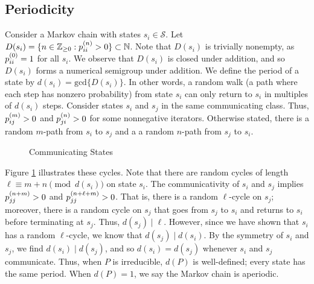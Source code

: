 \documentclass[../exploring-pagerank.tex]{subfiles}
\begin{document}
	\subsection{Periodicity}
	Consider a Markov chain with states $s_i \in \mathcal{S}$. Let $D(s_i) = \{n\in \mathbb{Z}_{\geq 0} : p^{(n)}_{ii} > 0 \} \subset \mathbb{N}$. Note that $D(s_i)$ is trivially nonempty, as $p^{(0)}_{ii} = 1$ for all $s_i$. We observe that $D(s_i)$ is closed under addition, and so $D(s_i)$ forms a numerical semigroup under addition. We define the period of a state by $d(s_i)=\text{gcd}\{D(s_i)\}$. In other words, a random walk (a path where each step has nonzero probability) from state $s_i$ can only return to $s_i$ in multiples of $d(s_i)$ steps. Consider states $s_i$ and $s_j$ in the same communicating class.
	Thus, $p^{(m)}_{ij} > 0$ and $p^{(n)}_{ji} > 0$ for some nonnegative iterators. Otherwise stated, there is a random $m$-path from $s_i$ to $s_j$ and a a random $n$-path from $s_j$ to $s_i$.
		\begin{figure}[h]
		\centering {}
		\caption{Communicating States}
		\label{fig:markov}
	\end{figure}

	Figure \ref{fig:markov} illustrates these cycles. Note that there are random cycles of length $\ell \equiv m+n \pmod{d(s_i)}$ on state $s_i$. The communicativity of $s_i$ and $s_j$ implies $p^{(n+m)}_{jj} > 0$ and $p^{(n + \ell + m)}_{jj} > 0$. That is, there is a random $\ell$-cycle on $s_j$; moreover, there is a random cycle on $s_j$ that goes from $s_j$ to $s_i$ and returns to $s_i$ before terminating at $s_j$. Thus, $d(s_j) \mid \ell$. However, since we have shown that $s_i$ has a random $\ell$-cycle, we know that $d(s_j) \mid d(s_i)$. By the symmetry of $s_i$ and $s_j$, we find $d(s_i) \mid d(s_j)$, and so $d(s_i) = d(s_j)$ whenever $s_i$ and $s_j$ communicate. Thus, when $P$ is irreducible, $d(P)$ is well-defined; every state has the same period. When $d(P) = 1$, we say the Markov chain is aperiodic.
\end{document}
